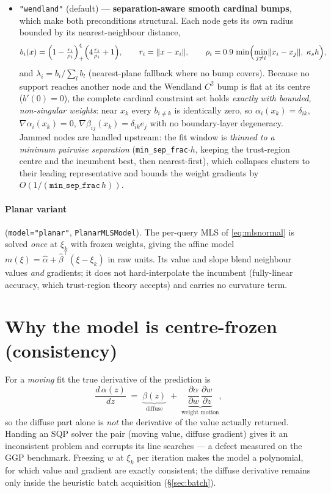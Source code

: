 \documentclass[11pt,a4paper]{article}
\newcommand{\code}[1]{\texttt{#1}}
\newcommand{\xxi}{\xi}
\begin{document}
\begin{itemize}
\item \code{"wendland"} (default) — \textbf{separation-aware smooth
cardinal bumps}, which make both preconditions structural. Each node gets
its own radius bounded by its nearest-neighbour distance,
\begin{equation}
b_i(x) = \Bigl(1 - \tfrac{r_i}{\rho_i}\Bigr)_+^{4}
\Bigl(4\tfrac{r_i}{\rho_i} + 1\Bigr), \qquad
r_i = \lVert x - x_i\rVert, \qquad
\rho_i = 0.9\, \min\Bigl(\min_{j \ne i} \lVert x_i - x_j\rVert,\;
\kappa_s h\Bigr),
\label{eq:wendland}
\end{equation}
and $\lambda_i = b_i / \sum_l b_l$ (nearest-plane fallback where no bump
covers). Because no support reaches another node and the Wendland $C^2$
bump is flat at its centre ($b'(0)=0$), the complete cardinal constraint
set holds \emph{exactly with bounded, non-singular weights}: near $x_k$
every $b_{i\ne k}$ is identically zero, so $\alpha_i(x_k) = \delta_{ik}$,
$\nabla\alpha_i(x_k) = 0$, $\nabla\beta_{ij}(x_k) = \delta_{ik} e_j$ with
no boundary-layer degeneracy. Jammed nodes are handled upstream: the fit
window is \emph{thinned to a minimum pairwise separation}
(\code{min\_sep\_frac}$\cdot h$, keeping the trust-region centre and the
incumbent best, then nearest-first), which collapses clusters to their
leading representative and bounds the weight gradients by
$O(1/(\code{min\_sep\_frac}\, h))$.
\end{itemize}

\paragraph{Planar variant} (\code{model="planar"}, \code{PlanarMLSModel}).
The per-query MLS of \eqref{eq:mlsnormal} is solved \emph{once} at $\xxi_k$
with frozen weights, giving the affine model
$m(\xxi) = \hat\alpha + \hat\beta^{\top}(\xxi - \xxi_k)$ in raw units. Its
value and slope blend neighbour values \emph{and} gradients; it does not
hard-interpolate the incumbent (fully-linear accuracy, which trust-region
theory accepts) and carries no curvature term.

\section{Why the model is centre-frozen (consistency)}
\label{sec:consistency}
For a \emph{moving} fit the true derivative of the prediction is
\begin{equation}
\frac{d\,\alpha(z)}{dz}
\;=\; \underbrace{\beta(z)}_{\text{diffuse}}
\;+\; \underbrace{\frac{\partial \alpha}{\partial w}\,
\frac{\partial w}{\partial z}}_{\text{weight motion}},
\end{equation}
so the diffuse part alone is \emph{not} the derivative of the value actually
returned. Handing an SQP solver the pair (moving value, diffuse gradient)
gives it an inconsistent problem and corrupts its line searches --- a defect
measured on the GGP benchmark. Freezing $w$ at $\xxi_k$ per iteration makes
the model a polynomial, for which value and gradient are exactly consistent;
the diffuse derivative remains only inside the heuristic batch acquisition
(\S\ref{sec:batch}).
\end{document}
